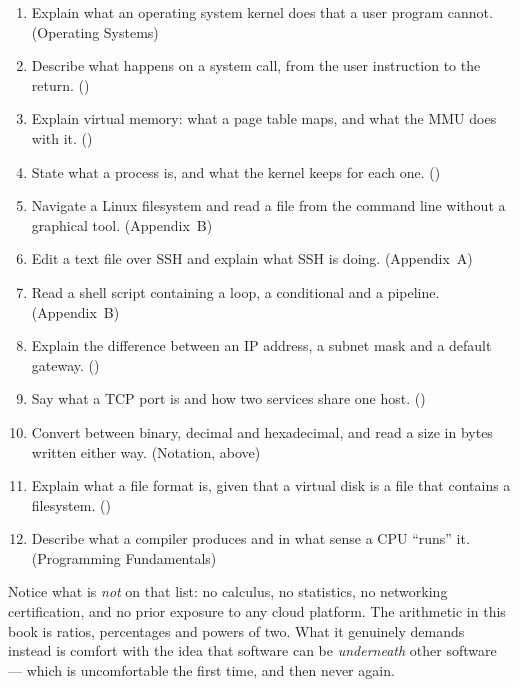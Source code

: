 \begin{enumerate}[leftmargin=2.4em, itemsep=4pt, topsep=4pt]
  \item Explain what an operating system kernel does that a user program cannot.
        \hfill{\scriptsize\color{neutral}(Operating Systems)}
  \item Describe what happens on a system call, from the user instruction to the
        return. \hfill{\scriptsize\color{neutral}()}
  \item Explain virtual memory: what a page table maps, and what the MMU does
        with it. \hfill{\scriptsize\color{neutral}()}
  \item State what a process is, and what the kernel keeps for each one.
        \hfill{\scriptsize\color{neutral}()}
  \item Navigate a Linux filesystem and read a file from the command line
        without a graphical tool. \hfill{\scriptsize\color{neutral}(Appendix~B)}
  \item Edit a text file over SSH and explain what SSH is doing.
        \hfill{\scriptsize\color{neutral}(Appendix~A)}
  \item Read a shell script containing a loop, a conditional and a pipeline.
        \hfill{\scriptsize\color{neutral}(Appendix~B)}
  \item Explain the difference between an IP address, a subnet mask and a
        default gateway. \hfill{\scriptsize\color{neutral}()}
  \item Say what a TCP port is and how two services share one host.
        \hfill{\scriptsize\color{neutral}()}
  \item Convert between binary, decimal and hexadecimal, and read a size in
        bytes written either way. \hfill{\scriptsize\color{neutral}(Notation,
        above)}
  \item Explain what a file format is, given that a virtual disk is a file that
        contains a filesystem. \hfill{\scriptsize\color{neutral}()}
  \item Describe what a compiler produces and in what sense a CPU
        ``runs'' it. \hfill{\scriptsize\color{neutral}(Programming
        Fundamentals)}
\end{enumerate}

\begin{conceptbox}
Notice what is \emph{not} on that list: no calculus, no statistics, no
networking certification, and no prior exposure to any cloud platform. The
arithmetic in this book is ratios, percentages and powers of two. What it
genuinely demands instead is comfort with the idea that software can be
\emph{underneath} other software --- which is uncomfortable the first time, and
then never again.
\end{conceptbox}

\newpage
\tableofcontents
\newpage
\listoffigures
\newpage

